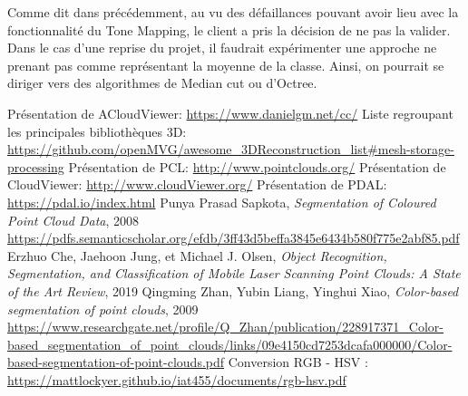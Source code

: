 \documentclass[12pt,titlepage,french]{article}
\begin{document}
Comme dit dans précédemment, au vu des défaillances pouvant avoir lieu avec la fonctionnalité du Tone Mapping, le client a pris la décision de ne pas la valider. Dans le cas d'une reprise du projet, il faudrait expérimenter une approche ne prenant pas comme représentant la moyenne de la classe. Ainsi, on pourrait se diriger vers des algorithmes de Median cut ou d'Octree.

\newpage
\begin{thebibliography}{3}
	 Présentation de ACloudViewer: \url{https://www.danielgm.net/cc/}
	 Liste regroupant les principales bibliothèques 3D: \url{https://github.com/openMVG/awesome_3DReconstruction_list#mesh-storage-processing}
	 Présentation de PCL: \url{http://www.pointclouds.org/}
	 Présentation de CloudViewer: \url{http://www.cloudViewer.org/}
	 Présentation de PDAL: \url{https://pdal.io/index.html}
	 Punya Prasad Sapkota, \textit{Segmentation of Coloured Point Cloud Data}, 2008 \url{https://pdfs.semanticscholar.org/efdb/3ff43d5beffa3845e6434b580f775e2abf85.pdf}
	 Erzhuo Che, Jaehoon Jung, et Michael J. Olsen, \textit{Object Recognition, Segmentation, and Classification of Mobile Laser Scanning Point Clouds: A State of the Art Review}, 2019
	 Qingming Zhan, Yubin Liang, Yinghui Xiao, \textit{Color-based segmentation of point clouds}, 2009 \url{https://www.researchgate.net/profile/Q_Zhan/publication/228917371_Color-based_segmentation_of_point_clouds/links/09e4150cd7253dcafa000000/Color-based-segmentation-of-point-clouds.pdf}
  	 Conversion RGB - HSV : \url{https://mattlockyer.github.io/iat455/documents/rgb-hsv.pdf}
\end{thebibliography}
\end{document}
